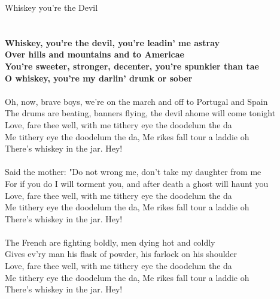 \documentclass[letterpaper,9pt]{article}
\begin{document}
\newpage
{}
\huge
Whiskey you're the Devil\\
\\
\LARGE
\noindent
\\\textbf{Whiskey, you're the devil, you're leadin' me astray
\\Over hills and mountains and to Americae
\\You're sweeter, stronger, decenter, you're spunkier than tae
\\O whiskey, you're my darlin' drunk or sober}
\\
\\Oh, now, brave boys, we're on the march and off to Portugal and Spain
\\The drums are beating, banners flying, the devil ahome will come tonight
\\Love, fare thee well, with me tithery eye the doodelum the da
\\Me tithery eye the doodelum the da, Me rikes fall tour a laddie oh
\\There's whiskey in the jar. Hey!
\\
\\Said the mother: "Do not wrong me, don't take my daughter from me
\\For if you do I will torment you, and after death a ghost will haunt you
\\Love, fare thee well, with me tithery eye the doodelum the da
\\Me tithery eye the doodelum the da, Me rikes fall tour a laddie oh
\\There's whiskey in the jar. Hey!
\\
\\The French are fighting boldly, men dying hot and coldly
\\Gives ev'ry man his flask of powder, his farlock on his shoulder
\\Love, fare thee well, with me tithery eye the doodelum the da
\\Me tithery eye the doodelum the da, Me rikes fall tour a laddie oh
\\There's whiskey in the jar. Hey!
\end{document}
